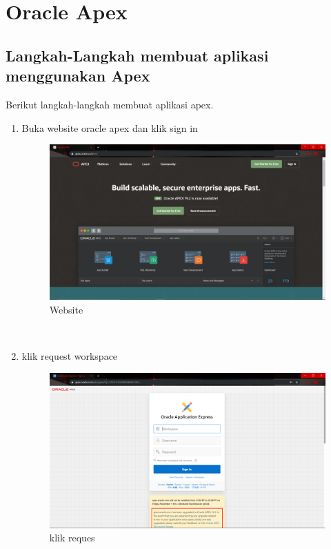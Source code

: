 \chapter*{Oracle Apex}

\section{Langkah-Langkah membuat aplikasi menggunakan Apex}

Berikut langkah-langkah membuat aplikasi apex.
\begin{enumerate}
\item Buka website oracle apex dan klik sign in
\begin{figure}[H]
        \centerline{\includegraphics[scale=0.2]{figures/1}}
        \caption{Website}
		\label{langkah1}
\end{figure} \\

\item klik request workspace
\begin{figure}[H]
        \centerline{\includegraphics[scale=0.2]{figures/2}}
        \caption{klik reques}
		\label{langkah2}
\end{figure} \\



\end{enumerate}
